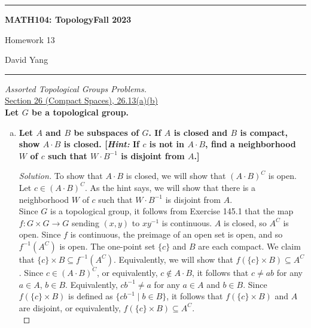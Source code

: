 \documentclass[11pt]{article}
\newenvironment{solution}
  {\renewcommand\qedsymbol{$\blacksquare$}\begin{proof}[Solution]}
  {\end{proof}}
\begin{document}
	\hrule
	\begin{center}
        \textbf{MATH104: Topology}\hfill \textbf{Fall 2023}\newline

		{\Large Homework 13}

		David Yang
	\end{center}

\hrule

\vspace{1em}

\textit{Assorted Topological Groups Problems.} \\

\underline{Section 26 (Compact Spaces), 26.13(a)(b)} \\

\textbf{Let $G$ be a topological group.}
\begin{enumerate}[a)]
    \item \textbf{Let $A$ and $B$ be subspaces of $G$. If $A$ is closed and $B$ is compact, show $A \cdot B$ is closed. [\textit{Hint:} If $c$ is not in $A \cdot B$, find a neighborhood $W$ of $c$ such that
    $W \cdot B^{-1}$ is disjoint from $A$.]}

    \begin{solution}
    To show that $A \cdot B$ is closed, we will show that $(A \cdot B)^C$ is open. Let $c \in (A \cdot B)^C$. As the hint says, we will show that there is a neighborhood $W$ of $c$ such that
    $W \cdot B^{-1}$ is disjoint from $A$. \\
    
    Since $G$ is a topological group, it follows from Exercise 145.1 that the map $f \colon G \times G \rightarrow G$ sending $(x, y)$ to $xy^{-1}$ is continuous. $A$ is closed, so $A^C$ is open. Since $f$ is continuous, the preimage of an open set is open, and so $f^{-1}(A^C)$ is open. The one-point set $\{ c \}$ and $B$ are each compact. We claim that $\{c\} \times B \subseteq f^{-1}(A^C)$. 
    Equivalently, we will show that $f(\{ c \} \times B) \subseteq A^C$. Since $c \in (A \cdot B)^C$, or equivalently, $c \notin A \cdot B$, it follows that $c \neq ab$ for any $a \in A$, $b \in B$. Equivalently, $c b^{-1} \neq a$ for any $a \in A$ and $b \in B$. Since $f(\{ c \} \times B)$ is defined as $\{cb^{-1} \mid b \in B\}$, 
    it follows that $f(\{c \} \times B)$ and $A$ are disjoint, or equivalently, $f(\{ c \} \times B) \subseteq A^C$. \\


\end{solution}
\end{enumerate}
\end{document}
